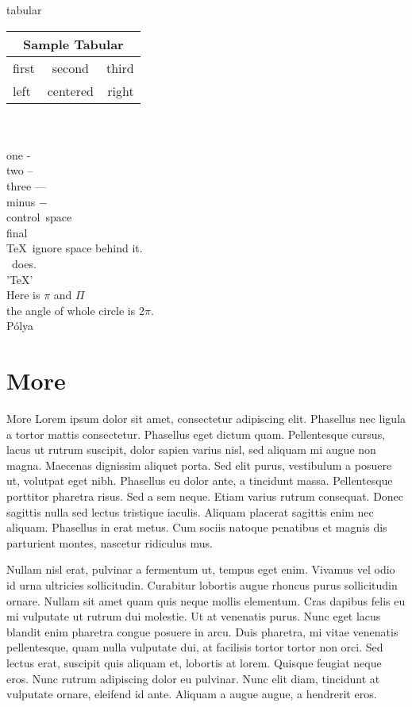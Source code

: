 \documentclass{book}
\begin{document}
tabular\\
\begin{tabular}{|l|c|r|}
  \hline
  \multicolumn{3}{|c|}{Sample Tabular}\\
  \hline
  first & second & third \\
  \cline{2-3}
  left  & centered & right \\
  \hline
\end{tabular}
\\\\
one -\\
two --\\
three ---\\
minus $ - $\\
control\ space\\
final\\
\TeX\ ignore space behind it.\\
\XeTeX\ does.\\
'\TeX'\\
Here is $\pi$ and $\Pi$\\
the angle of whole circle is 2$\pi$.\\
P\'olya\\





\section{More}
More Lorem ipsum dolor sit amet, consectetur adipiscing elit. Phasellus nec ligula a tortor mattis
consectetur. Phasellus eget dictum quam. Pellentesque cursus, lacus ut rutrum suscipit, dolor sapien varius nisl, sed
aliquam mi augue non magna. Maecenas dignissim aliquet porta. Sed elit purus, vestibulum a posuere ut, volutpat eget
nibh. Phasellus eu dolor ante, a tincidunt massa. Pellentesque porttitor pharetra risus. Sed a sem neque. Etiam varius
rutrum consequat. Donec sagittis nulla sed lectus tristique iaculis. Aliquam placerat sagittis enim nec
aliquam. Phasellus in erat metus. Cum sociis natoque penatibus et magnis dis parturient montes, nascetur ridiculus mus.

Nullam nisl erat, pulvinar a fermentum ut, tempus eget enim. Vivamus vel odio id urna ultricies sollicitudin. Curabitur
lobortis augue rhoncus purus sollicitudin ornare. Nullam sit amet quam quis neque mollis elementum. Cras dapibus felis
eu mi vulputate ut rutrum dui molestie. Ut at venenatis purus. Nunc eget lacus blandit enim pharetra congue posuere in
arcu. Duis pharetra, mi vitae venenatis pellentesque, quam nulla vulputate dui, at facilisis tortor tortor non orci. Sed
lectus erat, suscipit quis aliquam et, lobortis at lorem. Quisque feugiat neque eros. Nunc rutrum adipiscing dolor eu
pulvinar. Nunc elit diam, tincidunt at vulputate ornare, eleifend id ante. Aliquam a augue augue, a hendrerit eros.
\end{document}
